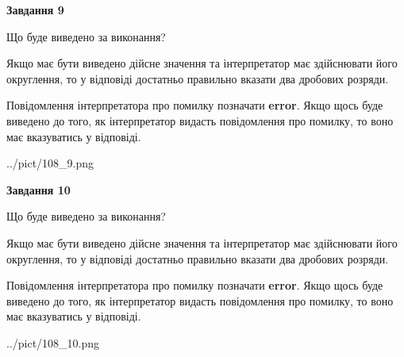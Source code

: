 \documentclass[12pt, ukrainian]{article}
\begin{document}
{\begin {Large}
{\begin {center}\textbf{Завдання 9}\end {center}}\par
Що буде виведено за виконання? \par

Якщо має бути виведено дійсне значення та інтерпретатор має здійснювати його округлення, 
то у відповіді достатньо правильно вказати два дробових розряди.

Повідомлення інтерпретатора про помилку позначати \textbf{error}.
Якщо щось буде виведено до того, як інтерпретатор видасть повідомлення про помилку, 
то воно має вказуватись у відповіді. \par

\begin{center}
	{../pict/108_9.png}
\end{center}
\newpage

{\begin {center}\textbf{Завдання 10}\end {center}}\par
Що буде виведено за виконання? \par

Якщо має бути виведено дійсне значення та інтерпретатор має здійснювати його округлення, 
то у відповіді достатньо правильно вказати два дробових розряди.

Повідомлення інтерпретатора про помилку позначати \textbf{error}.
Якщо щось буде виведено до того, як інтерпретатор видасть повідомлення про помилку, 
то воно має вказуватись у відповіді. \par

\begin{center}
	{../pict/108_10.png}
\end{center}
\newpage

\end {Large}}
\end{document}
